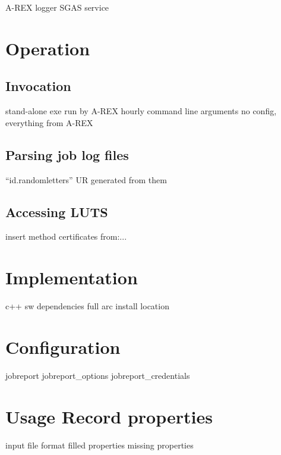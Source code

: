 \documentclass{article}                            %
\begin{document}
  A-REX
  logger
  SGAS service

\section{Operation}

  \subsection{Invocation}
    stand-alone exe
    run by A-REX hourly
    command line arguments
    no config, everything from A-REX

  \subsection{Parsing job log files}
    ``id.randomletters''
    UR generated from them

  \subsection{Accessing LUTS}
    insert method
    certificates from:...

\section{Implementation}
  c++
  sw dependencies
    full arc
  install location

\appendix

\section{Configuration}
  jobreport
  jobreport\_options
  jobreport\_credentials

\section{Usage Record properties}
  input file format
  filled properties
  missing properties


\end{document}
